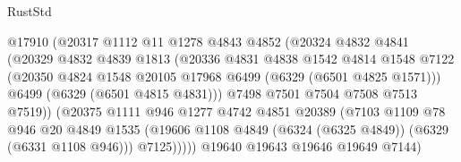 \begin{lexlean}{RustStd}
\begin{coremodule}
{{                              @17910
                              (@20317
                                @1112
                                @11
                                @1278
                                @4843
                                @4852
                                (@20324
                                  @4832
                                  @4841
                                  (@20329
                                    @4832
                                    @4839
                                    @1813
                                    (@20336
                                      @4831
                                      @4838
                                      @1542
                                      @4814
                                      @1548
                                      @7122
                                      (@20350
                                        @4824
                                        @1548
                                        @20105
                                        @17968
                                        @6499
                                        (@6329 (@6501 @4825 @1571)))
                                      @6499
                                      (@6329 (@6501 @4815 @4831)))
                                    @7498
                                    @7501
                                    @7504
                                    @7508
                                    @7513
                                    @7519))
                                (@20375
                                  @1111
                                  @946
                                  @1277
                                  @4742
                                  @4851
                                  @20389
                                  (@7103
                                    @1109
                                    @78
                                    @946
                                    @20
                                    @4849
                                    @1535
                                    (@19606
                                      @1108
                                      @4849
                                      (@6324 (@6325 @4849))
                                      (@6329 (@6331 @1108 @946)))
                                    @7125)))))
                          @19640
                          @19643
                          @19646
                          @19649
                          @7144)
}}
\end{coremodule}
\end{lexlean}

